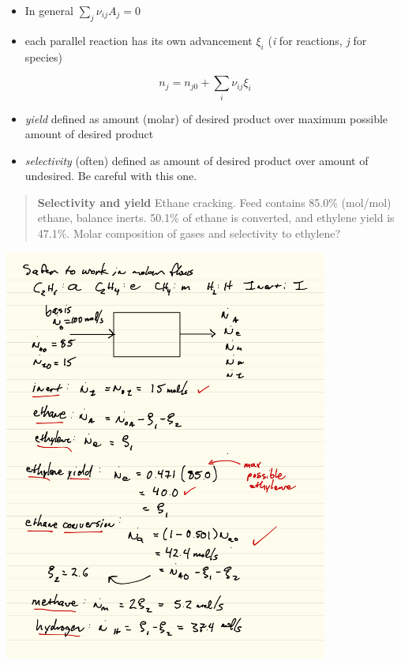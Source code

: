 \documentclass[11pt]{article}
\begin{document}
\begin{itemize}
\item In general \( \sum_{j} \nu_{ij} A_{j} = 0\)

\item each parallel reaction has its own advancement \(\xi_{i}\) (\emph{i} for reactions, \emph{j} for species)
\end{itemize}

\[ n_{j} = n_{j0} + \sum_{i} \nu_{ij} \xi_{i} \]

\begin{itemize}
\item \emph{yield} defined as amount (molar) of desired product over maximum possible amount of desired product

\item \emph{selectivity} (often) defined as amount of desired product over amount of
undesired.  Be careful with this one.
\end{itemize}

\begin{quote}
\hline
\textbf{Selectivity and yield}  Ethane cracking. Feed contains 85.0\% (mol/mol) ethane, balance inerts. 50.1\% of ethane is converted, and ethylene yield is 47.1\%.  Molar composition of gases and selectivity to ethylene?
\begin{center}

\end{center}
\hline
\end{quote}

\includegraphics[width=0.8\textwidth]{./figs/Multirxn1.png}
\end{document}
